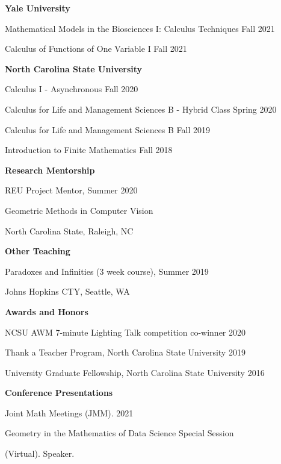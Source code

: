 \documentclass{article}
\begin{document}
\medskip
\medskip

\textsf{\textbf{Yale University}}

\medskip
Mathematical Models in the Biosciences I: Calculus Techniques
\hfill Fall 2021

\medskip
Calculus of Functions of One Variable I
\hfill Fall 2021

\medskip
\medskip
\textsf{\textbf{North Carolina State University}}

\medskip
Calculus I - Asynchronous %
\hfill Fall 2020

Calculus for Life and Management Sciences B - Hybrid Class %
\hfill Spring 2020 

Calculus for Life and Management Sciences B %
\hfill Fall 2019

Introduction to Finite Mathematics %
\hfill Fall 2018

\medskip
\medskip
\textsf{\textbf{Research Mentorship}}

\medskip
REU Project Mentor, \hfill Summer 2020

Geometric Methods in Computer Vision

North Carolina State, Raleigh, NC

\medskip
\medskip
\textsf{\textbf{Other Teaching}}

\medskip
Paradoxes and Infinities (3 week course), \hfill Summer 2019

Johns Hopkins CTY, Seattle, WA 


\bigskip
\bigskip

\textsf{\textbf{\Large Awards and Honors}\hrulefill}

\medskip
NCSU AWM 7-minute Lighting Talk competition co-winner \hfill 2020

\medskip
Thank a Teacher Program, North Carolina State University \hfill 2019

\medskip
University Graduate Fellowship, North Carolina State University \hfill 2016

%
%
\bigskip
\bigskip


\textsf{\textbf{\Large Conference Presentations} \hrulefill}

\medskip
Joint Math Meetings (JMM). \hfill 2021

Geometry in the Mathematics of Data Science Special Session

(Virtual). Speaker.
\end{document}
